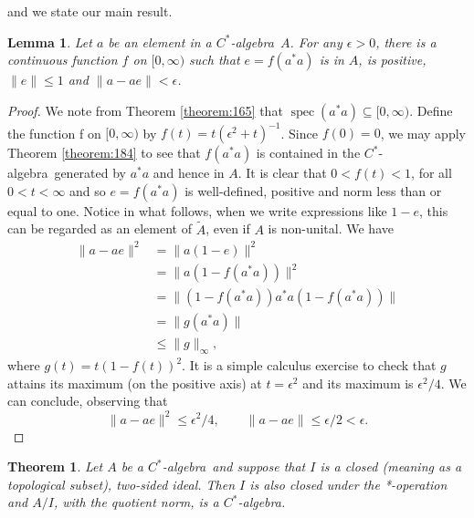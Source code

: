 \documentclass{book}
\newtheorem{lemma}[definition]{Lemma}
\newtheorem{theorem}[definition]{Theorem}
\def\cstar{\(C^*\)-algebra}
\begin{document}
and we state our main result.
\begin{lemma}
  Let \(a\) be an element in a \cstar\ \(A\). For any \(\epsilon > 0\), there
  is a continuous function \(f\) on \([0,\infty)\) such that \(e = f(a^*a)\) is in \(A\), is positive,
  \(\|e\| \leq 1\) and \(\|a-ae\| < \epsilon\).
\end{lemma}
\begin{proof}
  We note from Theorem \ref{theorem:165} that \(\operatorname{spec}(a^*a) \subseteq [0,\infty)\). Define the
  function f on \([0,\infty)\) by \(f(t) = t{(\epsilon^2 + t)}^{-1}\). Since \(f(0) = 0\), we may apply
  Theorem \ref{theorem:184} to see that \(f(a^*a)\) is contained in the \cstar\ generated
  by \(a^*a\) and hence in \(A\). It is clear that \(0 < f(t) < 1\), for all \(0 < t < \infty\)
  and so \(e = f(a^*a)\) is well-defined, positive and norm less than or equal to
  one. Notice in what follows, when we write expressions like \(1 - e\), this can
  be regarded as an element of \(\tilde{A}\), even if \(A\) is non-unital. We have
  \begin{align*}
  \|a -ae\|^2 &= \|a(1 -e)\|^2\\
  &= \|a(1 -f(a^*a))\|^2\\
  &= \|(1 -f(a^*a))a^*a(1-f(a^*a))\|\\
  &= \|g(a^*a)\|\\
  &\leq \|g\|_\infty,
  \end{align*}
  where \(g(t) = t{(1 - f(t))}^2\). It is a simple calculus exercise to check that \(g\)
  attains its maximum (on the positive axis) at \(t =\epsilon^2\) and its maximum is
  \(\epsilon^2/4\). We can conclude, observing that
  \[
    \|a-ae\|^2\leq\epsilon^2/4,\qquad\|a-ae\|\leq\epsilon/2<\epsilon.
  \]
\end{proof}
\begin{theorem}\label{theorem:191}
  Let \(A\) be a \cstar\ and suppose that \(I\) is a closed 
  (meaning as a topological subset), two-sided ideal. Then \(I\) is also closed under the
  *-operation and \(A/I\), with the quotient norm, is a \cstar.
\end{theorem} 
\end{document}
